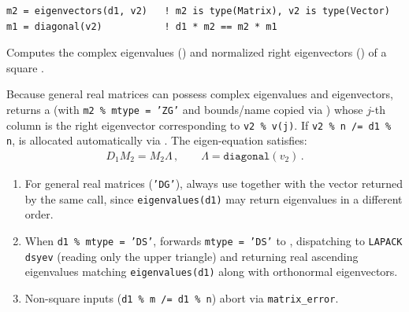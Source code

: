 \lstset{language=[95]Fortran}
\begin{lstlisting}
m2 = eigenvectors(d1, v2)   ! m2 is type(Matrix), v2 is type(Vector)
m1 = diagonal(v2)           ! d1 * m2 == m2 * m1
\end{lstlisting}

Computes the complex eigenvalues  () and normalized right eigenvectors  () of a square  .

Because general real matrices can possess complex eigenvalues and eigenvectors,  returns a   (with \texttt{m2 \% mtype = 'ZG'} and bounds/name copied via ) whose $j$-th column is the right eigenvector corresponding to \texttt{v2 \% v(j)}. If \texttt{v2 \% n /= d1 \% n},  is allocated automatically via . The eigen-equation satisfies:
\begin{align}
  D_1 M_2 = M_2 \Lambda\, , \qquad \Lambda = \texttt{diagonal}(v_2)\, .
\end{align}

\begin{notebox}
\begin{enumerate}
  \item For general real matrices (\texttt{'DG'}), always use  together with the vector  returned by the same  call, since \texttt{eigenvalues(d1)} may return eigenvalues in a different order.
  \item When \texttt{d1 \% mtype = 'DS'},  forwards \texttt{mtype = 'DS'} to , dispatching to \texttt{LAPACK} \texttt{dsyev} (reading only the upper triangle) and returning real ascending eigenvalues matching \texttt{eigenvalues(d1)} along with orthonormal eigenvectors.
  \item Non-square inputs (\texttt{d1 \% m /= d1 \% n}) abort via \texttt{matrix\_error}.
\end{enumerate}
\end{notebox}

\begin{description}[leftmargin=2.2cm, style=nextline]
\end{description}


